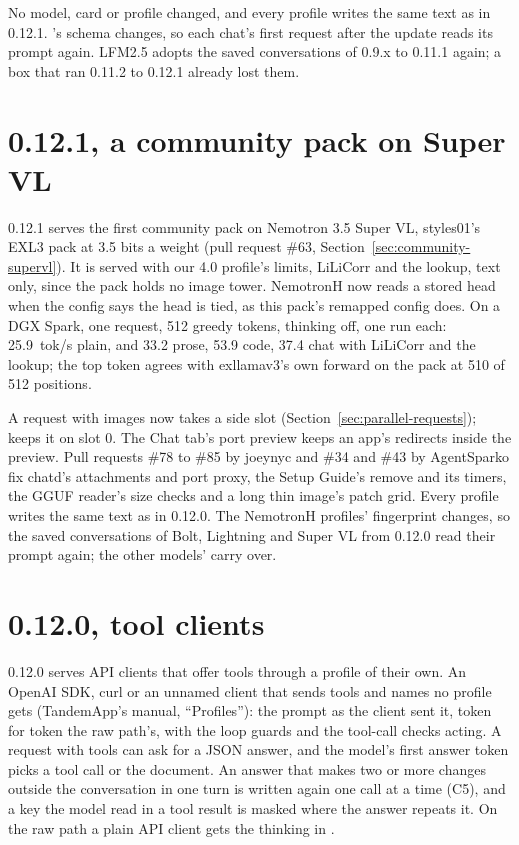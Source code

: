 No model, card or profile changed, and every profile writes the same text as in 0.12.1. 's schema changes, so each chat's first request after the update reads its prompt again. LFM2.5 adopts the saved conversations of 0.9.x to 0.11.1 again; a box that ran 0.11.2 to 0.12.1 already lost them.

\section{0.12.1, a community pack on Super VL}\label{sec:changelog-0121}

0.12.1 serves the first community pack on Nemotron 3.5 Super VL, styles01's EXL3 pack at 3.5 bits a weight (pull request \#63, Section~\ref{sec:community-supervl}). It is served with our 4.0 profile's limits, LiLiCorr and the lookup, text only, since the pack holds no image tower. NemotronH now reads a stored head when the config says the head is tied, as this pack's remapped config does. On a DGX Spark, one request, 512 greedy tokens, thinking off, one run each: 25.9~tok/s plain, and 33.2 prose, 53.9 code, 37.4 chat with LiLiCorr and the lookup; the top token agrees with exllamav3's own forward on the pack at 510 of 512 positions.

A request with images now takes a side slot (Section~\ref{sec:parallel-requests});  keeps it on slot 0. The Chat tab's port preview keeps an app's redirects inside the preview. Pull requests \#78 to \#85 by joeynyc and \#34 and \#43 by AgentSparko fix chatd's attachments and port proxy, the Setup Guide's remove and its timers, the GGUF reader's size checks and a long thin image's patch grid. Every profile writes the same text as in 0.12.0. The NemotronH profiles' fingerprint changes, so the saved conversations of Bolt, Lightning and Super VL from 0.12.0 read their prompt again; the other models' carry over.

\section{0.12.0, tool clients}\label{sec:changelog-0120}

0.12.0 serves API clients that offer tools through a profile of their own. An OpenAI SDK, curl or an unnamed client that sends tools and names no profile gets  (TandemApp's manual, \enquote{Profiles}): the prompt as the client sent it, token for token the raw path's, with the loop guards and the tool-call checks acting. A request with tools can ask for a JSON answer, and the model's first answer token picks a tool call or the document. An answer that makes two or more changes outside the conversation in one turn is written again one call at a time (C5), and a key the model read in a tool result is masked where the answer repeats it. On the raw path a plain API client gets the thinking in .

